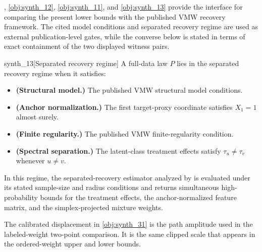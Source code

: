 \documentclass[11pt]{article}
\begin{document}
, \cref{obj:synth_12}, \cref{obj:synth_11}, and \cref{obj:synth_13} provide the interface for comparing the present lower bounds with the published VMW recovery framework. The cited model conditions and separated recovery regime are used as external publication-level gates, while the converse below is stated in terms of exact containment of the two displayed witness pairs.

\begin{definitionv}{synth_13}[Separated recovery regime]
A full-data law \(P\) lies in the separated recovery regime when it satisfies:
\begin{itemize}
\item \textbf{(Structural model.)} The published VMW structural model conditions.
\item \textbf{(Anchor normalization.)} The first target-proxy coordinate satisfies \(X_1=1\) almost surely.
\item \textbf{(Finite regularity.)} The published VMW finite-regularity condition.
\item \textbf{(Spectral separation.)} The latent-class treatment effects satisfy \(\tau_u\ne\tau_v\) whenever \(u\ne v\).
\end{itemize}
In this regime, the separated-recovery estimator analyzed by \citet{VirkMazaheriWu2026} is evaluated under its stated sample-size and radius conditions and returns simultaneous high-probability bounds for the treatment effects, the anchor-normalized feature matrix, and the simplex-projected mixture weights.
\end{definitionv}

The calibrated displacement in \cref{obj:synth_31} is the path amplitude used in the labeled-weight two-point comparison. It is the same clipped scale that appears in the ordered-weight upper and lower bounds.
\end{document}
